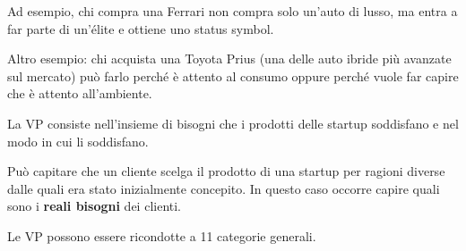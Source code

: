 Ad esempio, chi compra una Ferrari non compra solo un'auto di lusso, ma entra a
far parte di un'élite e ottiene uno status symbol.

Altro esempio: chi acquista una Toyota Prius (una delle auto ibride più
avanzate sul mercato) può farlo perché è attento al consumo oppure perché vuole
far capire che è attento all'ambiente.

La VP consiste nell'insieme di bisogni che i prodotti delle startup soddisfano
e nel modo in cui li soddisfano.

Può capitare che un cliente scelga il prodotto di una startup per ragioni
diverse dalle quali era stato inizialmente concepito. In questo caso occorre
capire quali sono i \textbf{reali bisogni} dei clienti.

Le VP possono essere ricondotte a 11 categorie generali.

